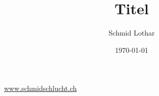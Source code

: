 \documentclass[a4paper, 12pt]{scrartcl}
\title{Titel}
\author{Schmid Lothar}
\date{\today}
\begin{document}
\maketitle[-1]
\tableofcontents 

\url{www.schmidschlucht.ch}
\blindtext
\citep{Nobody06}


\listoffigures


\end{document}
